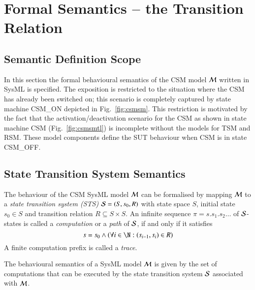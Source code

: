 \newpage
\section{Formal Semantics -- the Transition Relation}\label{sec:transrel}



\subsection{Semantic Definition Scope}
In this section   the formal behavioural semantics of the CSM model ${\cal M}$ written in SysML 
is specified. The exposition is restricted to the situation where the CSM has already been switched on; this scenario is completely captured by state machine  {\sf CSM\_ON} depicted in Fig.~\ref{fig:csmsm}. This restriction is motivated by the fact that the activation/deactivation scenario for the CSM as shown in state machine {\sf CSM} (Fig.~\ref{fig:csmsmtl}) is incomplete without the models for TSM and RSM. These model components define the SUT behaviour when CSM is in state {\sf CSM\_OFF}.



\subsection{State Transition System Semantics}
The behaviour of the CSM SysML model ${\cal M}$ can be formalised by mapping ${\cal M}$ to a {\it state transition system (STS)} ${\cal S} = (S,s_0,R)$ with state space $S$, initial state
 $s_0\in S$ and transition relation $R\subseteq S\times S$. An infinite   sequence $\pi = s.s_1.s_2 \ldots$ of ${\cal S}$-states  is called a \emph{computation} or a \emph{path} of ${\cal S}$, if and only if it satisfies 
\[
    s = s_0 \wedge  \left(\forall i \in \N: (s_{i-1},s_i)\in R\right) 
\]
A finite computation prefix is called  a {\it trace}.

The behavioural semantics of a SysML model ${\cal M}$ is   given by the set of computations that can be executed by the state transition system ${\cal S}$ associated with ${\cal M}$. 


